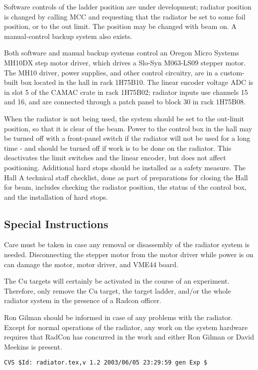 Software controls of the ladder position are under development;
radiator position is changed by calling
MCC and requesting that the radiator be set to some foil position,
or to the out limit.
The position may be changed with beam on.
A manual-control backup system also exists.

Both software and manual backup systems
control an Oregon Micro Systems MH10DX step motor driver,
which drives a Slo-Syn M063-LS09 stepper motor.
The MH10 driver, power supplies, and other control circuitry, 
are in a custom-built box located in the hall in rack 1H75B10.
The linear encoder voltage ADC is in slot 5 of the CAMAC crate in 
rack 1H75B02; radiator inputs use channels 15 and 16, and
are connected through a patch panel to block 30 in rack 1H75B08.

When the radiator is not being used, the system should be set to the
out-limit position, so that it is clear of the beam.
Power to the control box in the hall may be turned off with a front-panel 
switch if the radiator will not be used for a long time - and should be 
turned off if work is to be done on the radiator.
This deactivates the limit switches and the linear encoder, 
but does not affect positioning.
Additional hard stops should be installed as a safety measure.
The Hall A technical staff checklist, done as part of preparations for
closing the Hall for beam, includes checking the radiator
position, the status of the control box, and the installation of hard stops.

\subsection{Special Instructions}

Care must be taken in case any removal or disassembly of the radiator
system is needed.
Disconnecting the stepper motor from the motor driver
while power is on can damage the motor, motor driver, and VME44 board.

The Cu targets will certainly be activated in the course of an experiment.
Therefore, only remove the Cu target, the target ladder,
and/or the whole radiator system in the presence of a Radcon officer.

Ron Gilman should be informed in case of any problems with the radiator.
Except for normal operations of the radiator, any work on the
system hardware requires that RadCon has concurred in the work and
either Ron Gilman or David Meekins is present.


%
%
{\small
\begin{verbatim}CVS $Id: radiator.tex,v 1.2 2003/06/05 23:29:59 gen Exp $\end{verbatim}
}
